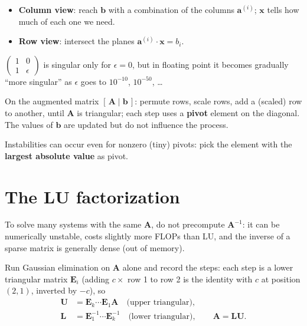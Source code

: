 \documentclass[11pt,a4paper,openany]{book}
\begin{document}
\begin{propbox}[title=Geometric interpretations]
\begin{itemize}
  \item \textbf{Column view}: reach $\mathbf{b}$ with a combination of the columns
        $\mathbf{a}^{(i)}$; $\mathbf{x}$ tells how much of each one we need.
  \item \textbf{Row view}: intersect the planes $\mathbf{a}^{(i)} \cdot \mathbf{x} = b_i$.
\end{itemize}
\end{propbox}

\begin{warnbox}[title=Pure vs numerical mathematics]
$\begin{pmatrix} 1 & 0 \\ 1 & \epsilon \end{pmatrix}$ is singular only for $\epsilon = 0$, but in
floating point it becomes gradually ``more singular'' as $\epsilon$ goes to $10^{-10}$,
$10^{-50}$, \dots
\end{warnbox}


\begin{algbox}[title=Gaussian elimination]
On the augmented matrix $[\,\mathbf{A} \mid \mathbf{b}\,]$: permute rows, scale rows, add a
(scaled) row to another, until $\mathbf{A}$ is triangular; each step uses a \textbf{pivot}
element on the diagonal. The values of $\mathbf{b}$ are updated but do not influence the
process.
\end{algbox}

\begin{warnbox}[title=Pivoting]
Instabilities can occur even for nonzero (tiny) pivots: pick the element with the
\textbf{largest absolute value} as pivot.
\end{warnbox}


\section{The LU factorization}

\begin{warnbox}[title=Don't compute the inverse]
To solve many systems with the same $\mathbf{A}$, do not precompute $\mathbf{A}^{-1}$: it can
be numerically unstable, costs slightly more FLOPs than LU, and the inverse of a sparse matrix
is generally dense (out of memory).
\end{warnbox}

\begin{defnbox}[title=LU factorization]
Run Gaussian elimination on $\mathbf{A}$ alone and record the steps: each step is a lower
triangular matrix $\mathbf{E}_i$ (adding $c \times$ row 1 to row 2 is the identity with $c$ at
position $(2,1)$, inverted by $-c$), so
\begin{align*}
\mathbf{U} &= \mathbf{E}_k \cdots \mathbf{E}_1\mathbf{A} \quad \text{(upper triangular)}, \\
\mathbf{L} &= \mathbf{E}_1^{-1} \cdots \mathbf{E}_k^{-1} \quad \text{(lower triangular)}, \qquad
\mathbf{A} = \mathbf{L}\mathbf{U}.
\end{align*}
\end{defnbox}
\end{document}
